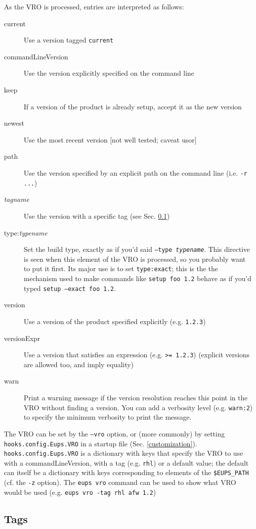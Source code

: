 \documentclass{article}
\newcommand{\code}[1]{\texttt{#1}}
\begin{document}
As the VRO is processed, entries are interpreted as follows:
\begin{description}
\item[current]
   Use a version tagged \code{current}
\item[commandLineVersion]
   Use the version explicitly specified on the command line
\item[keep]
   If a version of the product is already setup, accept it as the new version
\item[newest]
   Use the most recent version [not well tested; caveat usor]
\item[path]
   Use the version specified by an explicit path on the command line (i.e. \code{-r ...})
\item[\textit{tagname}]
   Use the version with a specific tag (see Sec. \ref{tags})
\item[type:\textit{typename}]
   Set the build type, exactly as if you'd said \code{--type \textit{typename}}.  This directive is seen
   when this element of the VRO is processed, so you probably want to put it first.  Its major use is to
   set \code{type:exact};  this is the the mechanism used to make commands like \code{setup foo 1.2}
   behave as if you'd typed \code{setup --exact foo 1.2}.
\item[version]
   Use a version of the product specified explicitly (e.g. \code{1.2.3})
\item[versionExpr]
   Use a version that satisfies an expression (e.g. \code{>= 1.2.3})
   (explicit versions are allowed too, and imply equality)
\item[warn]
   Print a warning message if the version resolution reaches this point in the VRO without finding a version.
   You can add a verbosity level (e.g. \code{warn:2}) to specify the minimum verbosity to print the message.
\end{description}

The VRO can be set by the \code{--vro} option, or (more commonly) by setting \code{hooks.config.Eups.VRO}
in a startup file (Sec. \ref{customization}).  \code{hooks.config.Eups.VRO} is a dictionary with
keys that specify the VRO to use with a commandLineVersion, with a tag (e.g. \code{rhl}) or a default value;
the default can itself be a dictionary with keys corresponding to elements of the \code{\$EUPS\_PATH} (cf. the
\code{-z} option).  The \code{eups vro} command can be used to show what VRO would be used (e.g. \code{eups vro -tag rhl afw 1.2})

\subsection{Tags}
\label{tags}
\end{document}
